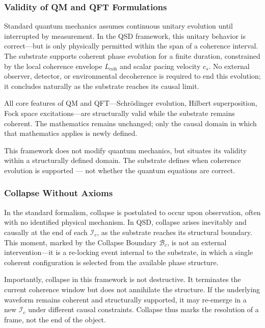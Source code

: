 \documentclass[entropy,article,submit,pdftex,moreauthors]{Definitions/mdpi}
\begin{document}
\subsubsection{Validity of QM and QFT Formulations}

Standard quantum mechanics assumes continuous unitary evolution until interrupted by measurement. In the QSD framework, this unitary behavior is correct—but is only physically permitted within the span of a coherence interval. The substrate supports coherent phase evolution for a finite duration, constrained by the local coherence envelope \( L_{\text{coh}} \) and scalar pacing velocity \( c_s \). No external observer, detector, or environmental decoherence is required to end this evolution; it concludes naturally as the substrate reaches its causal limit.

All core features of QM and QFT—Schrödinger evolution, Hilbert superposition, Fock space excitations—are structurally valid while the substrate remains coherent. The mathematics remains unchanged; only the causal domain in which that mathematics applies is newly defined.

This framework does not modify quantum mechanics, but situates its validity within a structurally defined domain. The substrate defines when coherence evolution is supported — not whether the quantum equations are correct.

\subsubsection{Collapse Without Axioms}

In the standard formalism, collapse is postulated to occur upon observation, often with no identified physical mechanism. In QSD, collapse arises inevitably and causally at the end of each \( \mathcal{I}_c \), as the substrate reaches its structural boundary. This moment, marked by the Collapse Boundary \( \mathcal{B}_c \), is not an external intervention—it is a re-locking event internal to the substrate, in which a single coherent configuration is selected from the available phase structure.

Importantly, collapse in this framework is not destructive. It terminates the current coherence window but does not annihilate the structure. If the underlying waveform remains coherent and structurally supported, it may re-emerge in a new \( \mathcal{I}_c \) under different causal constraints. Collapse thus marks the resolution of a frame, not the end of the object.
\end{document}
